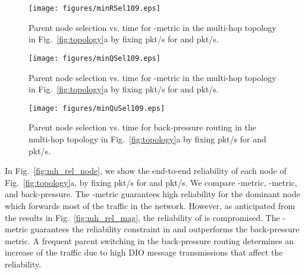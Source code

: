 \documentclass[review, 1p, 11pt]{elsarticle}
\numberwithin{equation}{section}
\begin{document}
 \begin{figure}[h] \centering
\texttt{[image: figures/minRSel109.eps]}
\caption{Parent node selection vs. time for -metric in the multi-hop topology in Fig.~\ref{fig:topology}a by fixing  pkt/s for  and  pkt/s.
 \label{fig:route_r}}
\end{figure}


 \begin{figure}[h] \centering
\texttt{[image: figures/minQSel109.eps]}
\caption{Parent node selection vs. time for -metric in the multi-hop topology in Fig.~\ref{fig:topology}a by fixing  pkt/s for  and  pkt/s.
 \label{fig:route_q}}
\end{figure}

 \begin{figure}[h] \centering
\texttt{[image: figures/minQuSel109.eps]}
\caption{Parent node selection vs. time for back-pressure routing in the multi-hop topology in Fig.~\ref{fig:topology}a by fixing  pkt/s for  and  pkt/s.
 \label{fig:route_back}}
\end{figure}






In Fig.~\ref{fig:mh_rel_node}, we show the end-to-end reliability of each node of Fig.~\ref{fig:topology}a, by fixing  pkt/s for  and  pkt/s. We compare -metric, -metric, and back-pressure. The -metric guarantees high reliability for the dominant node  which forwards most of the traffic in the network. However, as anticipated from the results in Fig.~\ref{fig:mh_rel_mag}, the reliability of  is compromised. The -metric guarantees the reliability constraint in  and outperforms the back-pressure metric. A frequent parent switching in the back-pressure routing determines an increase of the traffic due to high DIO message transmissions that affect the reliability.
\end{document}
